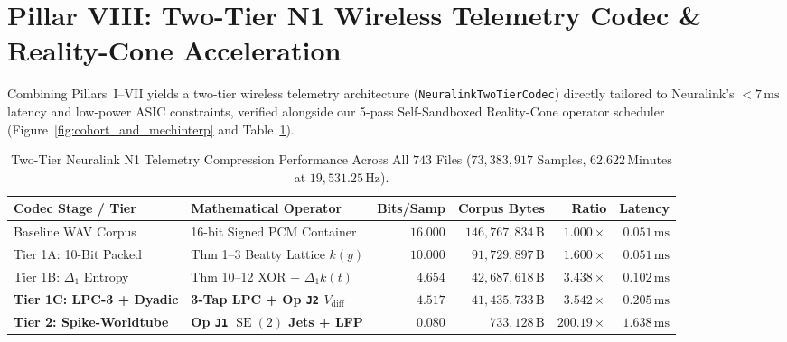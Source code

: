 \documentclass[11pt,letterpaper]{article}
\newcommand{\lean}[1]{\nolinkurl{#1}}
\theoremstyle{definition}
\begin{document}
\section[Pillar VIII: Two-Tier N1 Telemetry Codec \& Reality-Cone Collapse]{Pillar VIII: Two-Tier N1 Wireless Telemetry Codec \& Reality-Cone Acceleration}

Combining Pillars~I--VII yields a two-tier wireless telemetry architecture (\lean{NeuralinkTwoTierCodec}) directly tailored to Neuralink's $< 7\,\text{ms}$ latency and low-power ASIC constraints, verified alongside our 5-pass Self-Sandboxed Reality-Cone operator scheduler (Figure~\ref{fig:cohort_and_mechinterp} and Table~\ref{tab:compression_tiers}).

\begin{table}[htbp]
\centering
\caption{Two-Tier Neuralink N1 Telemetry Compression Performance Across All $743$ Files ($73{,}383{,}917$ Samples, $62.622\,\text{Minutes}$ at $19{,}531.25\,\text{Hz}$).}
\label{tab:compression_tiers}
\footnotesize
\setlength{\tabcolsep}{3.0pt}
\begin{tabular}{@{}llrrrr@{}}
\toprule
\textbf{Codec Stage / Tier} & \textbf{Mathematical Operator} & \textbf{Bits/Samp} & \textbf{Corpus Bytes} & \textbf{Ratio} & \textbf{Latency} \\
\midrule
Baseline WAV Corpus & 16-bit Signed PCM Container & $16.000$ & $146{,}767{,}834\,\text{B}$ & $1.000\times$ & $0.051\,\text{ms}$ \\
Tier 1A: 10-Bit Packed & Thm 1--3 Beatty Lattice $k(y)$ & $10.000$ & $91{,}729{,}897\,\text{B}$ & $1.600\times$ & $0.051\,\text{ms}$ \\
Tier 1B: $\Delta_1$ Entropy & Thm 10--12 XOR + $\Delta_1 k(t)$ & $4.654$ & $42{,}687{,}618\,\text{B}$ & $3.438\times$ & $0.102\,\text{ms}$ \\
\textbf{Tier 1C: LPC-3 + Dyadic} & \textbf{3-Tap LPC + Op \texttt{J2} $V_{\mathrm{diff}}$} & \textbf{$4.517$} & \textbf{$41{,}435{,}733\,\text{B}$} & \textbf{$3.542\times$} & \textbf{$0.205\,\text{ms}$} \\
\midrule
\textbf{Tier 2: Spike-Worldtube} & \textbf{Op \texttt{J1} $\operatorname{SE}(2)$ Jets + LFP} & \textbf{$0.080$} & \textbf{$733{,}128\,\text{B}$} & \textbf{$200.19\times$} & \textbf{$1.638\,\text{ms}$} \\
\bottomrule
\end{tabular}
\end{table}
\end{document}
